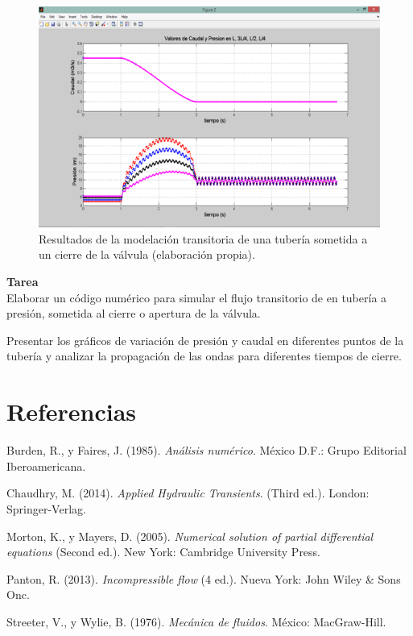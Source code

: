 \documentclass[letterpaper]{report}
\begin{document}
\begin{figure}[H]
	\centering
	\includegraphics[width=0.9\linewidth]{figuras/fig30}
	\caption{Resultados de la modelación transitoria de una tubería sometida a un cierre de la válvula (elaboración propia).}
	\label{fig:fig30}
\end{figure}

\textbf{Tarea}\\
Elaborar un código numérico para simular el flujo transitorio de en tubería a presión, sometida al cierre o apertura de la válvula.\bigskip

Presentar los gráficos de variación de presión y caudal en diferentes puntos de la tubería y analizar la propagación de las ondas para diferentes tiempos de cierre.

\section{Referencias}
Burden, R., y Faires, J. (1985). \textit{Análisis numérico}. México D.F.: Grupo Editorial Iberoamericana.\bigskip

Chaudhry, M. (2014). \textit{Applied Hydraulic Transients}. (Third ed.). London: Springer-Verlag.\bigskip

Morton, K., y Mayers, D. (2005). \textit{Numerical solution of partial differential equations} (Second ed.). New York: Cambridge University Press.\bigskip

Panton, R. (2013). \textit{Incompressible flow} (4 ed.). Nueva York: John Wiley \& Sons Onc.\bigskip

Streeter, V., y Wylie, B. (1976). \textit{Mecánica de fluidos}. México: MacGraw-Hill.
\end{document}
